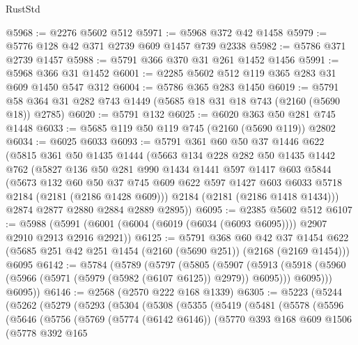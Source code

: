 \begin{lexlean}{RustStd}
\begin{coremodule}
@5968 := @2276 @5602 @512
@5971 := @5968 @372 @42 @1458
@5979 := @5776 @128 @42 @371 @2739 @609 @1457 @739 @2338
@5982 := @5786 @371 @2739 @1457
@5988 := @5791 @366 @370 @31 @261 @1452 @1456
@5991 := @5968 @366 @31 @1452
@6001 := @2285 @5602 @512 @119 @365 @283 @31 @609 @1450 @547 @312
@6004 := @5786 @365 @283 @1450
@6019 := @5791 @58 @364 @31 @282 @743 @1449 (@5685 @18 @31 @18 @743 (@2160 (@5690 @18)) @2785)
@6020 := @5791 @132
@6025 := @6020 @363 @50 @281 @745 @1448
@6033 := @5685 @119 @50 @119 @745 (@2160 (@5690 @119)) @2802
@6034 := @6025 @6033
@6093 := @5791
    @361
    @60
    @50
    @37
    @1446
    @622
    (@5815
      @361
      @50
      @1435
      @1444
      (@5663
        @134
        @228
        @282
        @50
        @1435
        @1442
        @762
        (@5827
          @136
          @50
          @281
          @990
          @1434
          @1441
          @597
          @1417
          @603
          @5844
          (@5673
            @132
            @60
            @50
            @37
            @745
            @609
            @622
            @597
            @1427
            @603
            @6033
            @5718
            @2184
            (@2181 (@2186 @1428 @609)))
          @2184
          (@2181 (@2186 @1418 @1434)))
        @2874
        @2877
        @2880
        @2884
        @2889
        @2895))
@6095 := @2385 @5602 @512
@6107 := @5988 (@5991 (@6001 (@6004 (@6019 (@6034 (@6093 @6095)))) @2907 @2910 @2913 @2916 @2921))
@6125 := @5791
    @368
    @60
    @42
    @37
    @1454
    @622
    (@5685 @251 @42 @251 @1454 (@2160 (@5690 @251)) (@2168 (@2169 @1454)))
    @6095
@6142 := @5784
    (@5789
      (@5797
        (@5805
          (@5907
            (@5913
              (@5918 (@5960 (@5966 (@5971 (@5979 (@5982 (@6107 @6125)) @2979)) @6095)))
              @6095)))
        @6095))
@6146 := @2568 (@2570 @222 @168 @1339)
@6305 := @5223
    (@5244
      (@5262
        (@5279
          (@5293
            (@5304
              (@5308
                (@5355
                  (@5419
                    (@5481
                      (@5578
                        (@5596
                          (@5646
                            (@5756
                              (@5769
                                (@5774 (@6142 @6146))
                                (@5770
                                  @393
                                  @168
                                  @609
                                  @1506
                                  (@5778
                                    @392
                                    @165

\end{coremodule}
\end{lexlean}
